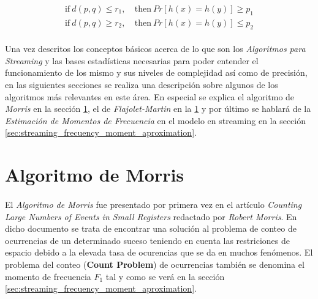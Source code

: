 \documentclass{subfiles}
\begin{document}
        \begin{align}
        \label{eq:hash_lsh}
          \text{if} \ d(p,q) \leq r_1, \ & \text{then} \ Pr[h(x) = h(y)] \geq p_1 \\
          \text{if} \ d(p,q) \geq r_2, \ & \text{then} \ Pr[h(x) = h(y)] \leq p_2
        \end{align}

      \paragraph{}
      Una vez descritos los conceptos básicos acerca de lo que son los \emph{Algoritmos para Streaming} y las bases estadísticas necesarias para poder entender el funcionamiento de los mismo y sus niveles de complejidad así como de precisión, en las siguientes secciones se realiza una descripción sobre algunos de los algoritmos más relevantes en este área. En especial se explica el algoritmo de \emph{Morris} en la sección \ref{sec:streaming_morris_algorithm}, el de \emph{Flajolet-Martin} en la \ref{sec:streaming_morris_algorithm} y por último se hablará de la \emph{Estimación de Momentos de Frecuencia} en el modelo en streaming en la sección \ref{sec:streaming_frecuency_moment_aproximation}.


    \section{Algoritmo de Morris}
    \label{sec:streaming_morris_algorithm}

      \paragraph{}
      El \emph{Algoritmo de Morris} fue presentado por primera vez en el artículo \emph{Counting Large Numbers of Events in Small Registers} \cite{morris1978counting} redactado por \emph{Robert Morris}. En dicho documento se trata de encontrar una solución al problema de conteo de ocurrencias de un determinado suceso teniendo en cuenta las restriciones de espacio debido a la elevada tasa de ocurencias que se da en muchos fenómenos. El problema del conteo (\textbf{Count Problem}) de ocurrencias también se denomina el momento de frecuencia $F_1$ tal y como se verá en la sección \ref{sec:streaming_frecuency_moment_aproximation}.
\end{document}
